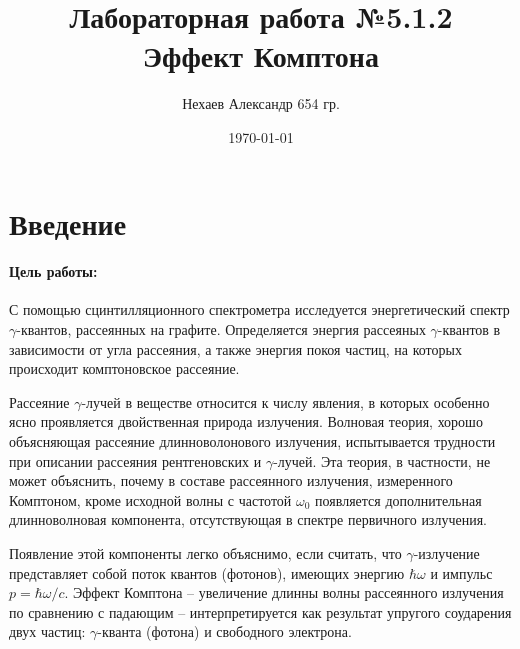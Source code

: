 \documentclass[a4paper, 12pt]{article}
\begin{document}
\title{Лабораторная работа №5.1.2\\Эффект Комптона}
\author{Нехаев Александр 654 гр.}
\date{\today}
\maketitle
\tableofcontents
\section{Введение}
\paragraph{Цель работы:}
С помощью сцинтилляционного спектрометра исследуется энергетический спектр $\gamma$-квантов, рассеянных на графите. Определяется энергия рассеяных $\gamma$-квантов в зависимости от угла рассеяния, а также энергия покоя частиц, на которых происходит комптоновское рассеяние.\par
Рассеяние $\gamma$-лучей в веществе относится к числу явления, в которых особенно ясно проявляется двойственная природа излучения. Волновая теория, хорошо объясняющая рассеяние длинноволонового излучения, испытывается трудности при описании рассеяния рентгеновских и $\gamma$-лучей. Эта теория, в частности, не может объяснить, почему в составе рассеянного излучения, измеренного Комптоном, кроме исходной волны с частотой $\omega_0$ появляется дополнительная длинноволновая компонента, отсутствующая в спектре первичного излучения.\par
Появление этой компоненты легко объяснимо, если считать, что $\gamma$-излучение представляет собой поток квантов (фотонов), имеющих энергию $\hbar\omega$ и импульс $p=\hbar\omega/c$. Эффект Комптона -- увеличение длинны волны рассеянного излучения по сравнению с падающим -- интерпретируется как результат упругого соударения двух частиц: $\gamma$-кванта (фотона) и свободного электрона.\par
\end{document}
